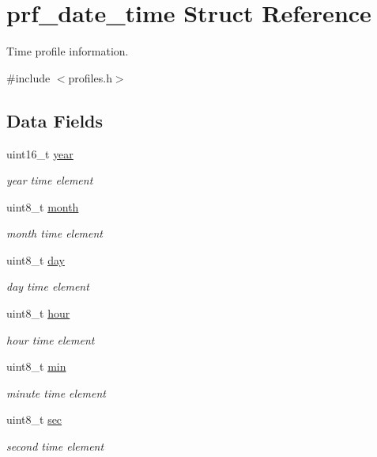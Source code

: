 \hypertarget{structprf__date__time}{}\section{prf\+\_\+date\+\_\+time Struct Reference}
\label{structprf__date__time}


Time profile information.  




{\ttfamily \#include $<$profiles.\+h$>$}

\subsection*{Data Fields}
\begin{DoxyCompactItemize}
\item 
uint16\+\_\+t \mbox{\hyperlink{structprf__date__time_a57ca98d8f6d4baf0fe41c583c7dcb0d5}{year}}
\begin{DoxyCompactList}\small\item\em year time element \end{DoxyCompactList}\item 
uint8\+\_\+t \mbox{\hyperlink{structprf__date__time_a3e00faf7fbf9805e9ec4d2edd6339050}{month}}
\begin{DoxyCompactList}\small\item\em month time element \end{DoxyCompactList}\item 
uint8\+\_\+t \mbox{\hyperlink{structprf__date__time_a72369a1087b2aeffe374bb054cb97c12}{day}}
\begin{DoxyCompactList}\small\item\em day time element \end{DoxyCompactList}\item 
uint8\+\_\+t \mbox{\hyperlink{structprf__date__time_ae5af4ff48939d13d480f87e56a9385d6}{hour}}
\begin{DoxyCompactList}\small\item\em hour time element \end{DoxyCompactList}\item 
uint8\+\_\+t \mbox{\hyperlink{structprf__date__time_ac9b481208b43f7c37ed25e446bdec692}{min}}
\begin{DoxyCompactList}\small\item\em minute time element \end{DoxyCompactList}\item 
uint8\+\_\+t \mbox{\hyperlink{structprf__date__time_ad1696900026b287a87c563b733a21bc3}{sec}}
\begin{DoxyCompactList}\small\item\em second time element \end{DoxyCompactList}\end{DoxyCompactItemize}


